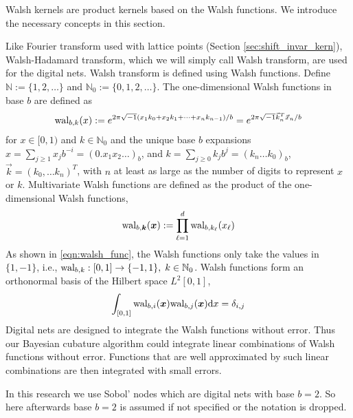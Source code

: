 \documentclass{iitthesis}          %
\newcommand{\bm}[1]{\boldsymbol{#1}}
\newcommand{\dif}[1]{\text{d}{#1}}
\newcommand{\naturals}{\mathbb{N}}
\newcommand{\vk}{\bm{k}}
\newcommand{\vx}{\bm{x}}
\newcommand{\dx}{\dif{{x}}}
\newcommand{\JRNote}[1]{{\textcolor{green}{JR: #1}}}
\begin{document}

Walsh kernels are product kernels based on the Walsh functions. We introduce the necessary concepts in this section.

Like Fourier transform used with lattice points (Section \ref{sec:shift_invar_kern}), Walsh-Hadamard transform, which we will simply call Walsh transform, are used for the digital nets. Walsh transform is defined using Walsh functions. Define $\naturals:=\lbrace1,2,\dots \rbrace$ and $\naturals_0 := \lbrace0,1,2,\dots \rbrace$.
The one-dimensional Walsh functions in base $b$ are defined as
\begin{align}
\label{eqn:walsh_func}
\textup{wal}_{b,k}(x) := e^{2\pi \sqrt{-1} (x_1 k_0 + x_2 k_1 + \dots + x_n k_{n-1})/b} 
=
e^{2\pi \sqrt{-1} {\vec{k}}_n^T{\vec{x}}_n/b}
\end{align}
for $x \in [0,1)$ and $k \in \naturals_0$ and the unique base $b$ expansions 
$x = \sum_{j \ge 1} x_j b^{-i} = (0.x_1 x_2 \dots)_b$,
and
$k = \sum_{j \ge 0} k_j b^{j} = (k_n \dots k_0)_b$, $\vec{k} =  (k_0,\dots k_n)^T$,
with $n$ at least as large as the number of digits to represent $x$ or $k$.
Multivariate Walsh functions are defined as the product of the one-dimensional Walsh functions,
\begin{align*}
\textup{wal}_{b,\vk} (\vx) := \prod_{\ell=1}^d \textup{wal}_{b,k_\ell} (x_\ell
)
\end{align*}
As shown in \eqref{eqn:walsh_func}, the Walsh functions only take the values in $\{1, -1\}$, i.e., $\textup{wal}_{b,k} : [0,1] \to {\{-1, 1\}} , \; k \in \naturals_0$. Walsh functions form an orthonormal basis of the Hilbert space $L^2[0,1]$,
\begin{align*}
\int_{[0,1]}
\textup{wal}_{b,i} (\vx) \textup{wal}_{b,j}(\vx) \dx = \delta_{i, j}
\end{align*}
Digital nets are designed to integrate the Walsh functions without error.
Thus our Bayesian cubature algorithm could integrate linear combinations of %
Walsh functions without error. Functions that are well approximated by such linear combinations are then integrated with small errors.

In this research we use Sobol' nodes which are digital nets with base $b=2$. So here afterwards base $b=2$ is assumed if not specified or the notation is dropped.  
\end{document}
